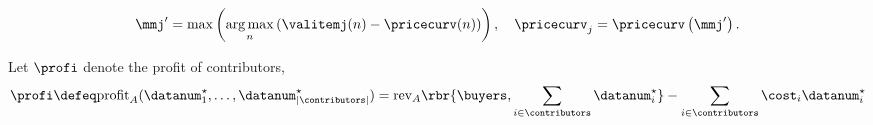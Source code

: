 \begin{align*}
\mmj'
= \max \left( \underset{n}{\arg\max} \left( \valitemj(n) - \pricecurv(n) \right) \right), 
\quad
\pricecurv_j 
= \pricecurv \left( \mmj' \right).
\end{align*}

Let $\profi$ denote the profit of contributors, 
\begin{align}
    \profi \defeq \mathrm{profit}_A(  \datanum_1^{\star},\dots, \datanum_{|\contributors|}^{\star})= \mathrm{rev}_A
\rbr{ \buyers,\sum_{i \in \contributors} {\datanum}_i^{\star}}- \sum_{i \in \contributors} \cost_i \datanum_i^{\star}
\end{align}